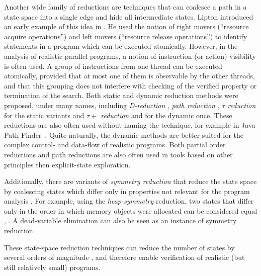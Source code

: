 Another wide family of reductions are techniques that can coalesce a path in a
state space into a single edge and hide all intermediate states.
Lipton introduced an early example of this idea in .
He used the notion of right movers (``resource acquire operations'') and
left movers (``resource release operations'') to identify statements in a
program which can be executed atomically.
However, in the analysis of realistic parallel programs, a notion of instruction (or action) visibility is often used.
A group of instructions from one thread can
be executed atomically, provided that at most one of them is observable by the
other threads, and that this grouping does not interfere with checking of the
verified property or termination of the search.
Both static and dynamic reduction methods were proposed, under many names,
including \emph{D-reduction} , \emph{path reduction}
, \emph{$\tau$ reduction}  for the static
variants and \emph{$\tau+$ reduction}  and  for the dynamic once.
These reductions are also often used without naming the technique, for example in
Java Path Finder~.
Quite naturally, the dynamic methods are better suited for the complex control-
and data-flow of realistic programs.
Both partial order reductions and path reductions are also often used in tools
based on other principles then explicit-state exploration.

Additionally, there are variants of \emph{symmetry reduction} that reduce the
state space by coalescing states which differ only in properties not relevant
for the program analysis \cite{Clarke1998}.
For example, using the \emph{heap-symmetry} reduction, two states that differ
only in the order in which memory objects were allocated can be considered
equal , .
A dead-variable elimination  can also be seen as an instance
of symmetry reduction.

These state-space reduction techniques can reduce the number of states by
several orders of magnitude , and therefore enable verification of
realistic (but still relatively small) programs.

